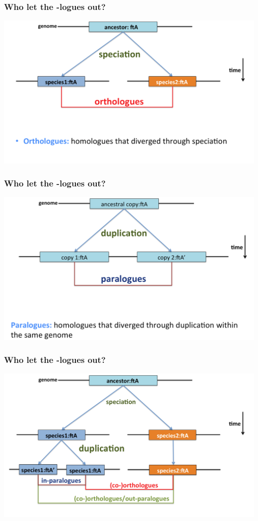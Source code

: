 \begin{frame}
  \frametitle{Who let the -logues out?}
  \begin{center}
    \includegraphics[width=1\textwidth]{images/logues2}  
  \end{center}  
\end{frame}

\begin{frame}
  \frametitle{Who let the -logues out?}
  \begin{center}
    \includegraphics[width=1\textwidth]{images/logues3}  
  \end{center}  
\end{frame}

\begin{frame}
  \frametitle{Who let the -logues out?}
  \begin{center}
    \includegraphics[width=1\textwidth]{images/logues4}  
  \end{center}  
\end{frame}

